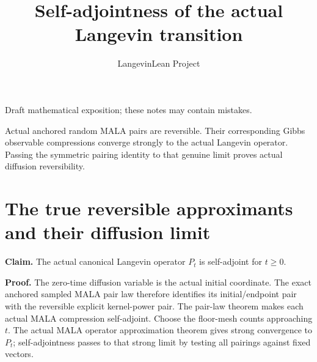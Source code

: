 \documentclass[11pt,a4paper]{article}
\title{\texorpdfstring{Self-adjointness of the actual Langevin transition}{Self-adjointness of the actual Langevin transition}}
\author{LangevinLean Project}
\date{}
\begin{document}
\maketitle
Draft mathematical exposition; these notes may contain mistakes.


Actual anchored random MALA pairs are reversible. Their corresponding Gibbs observable compressions converge strongly to the actual Langevin operator. Passing the symmetric pairing identity to that genuine limit proves actual diffusion reversibility.


\section{\texorpdfstring{The true reversible approximants and their diffusion limit}{The true reversible approximants and their diffusion limit}}


\textbf{Claim.} The actual canonical Langevin operator \(P_t\) is self-adjoint for \(t\ge0\).



\textbf{Proof.} The zero-time diffusion variable is the actual initial coordinate. The exact anchored sampled MALA pair law therefore identifies its initial/\allowbreak{}endpoint pair with the reversible explicit kernel-power pair. The pair-law theorem makes each actual MALA compression self-adjoint. Choose the floor-mesh counts approaching \(t\). The actual MALA operator approximation theorem gives strong convergence to \(P_t\); self-adjointness passes to that strong limit by testing all pairings against fixed vectors.
\end{document}
